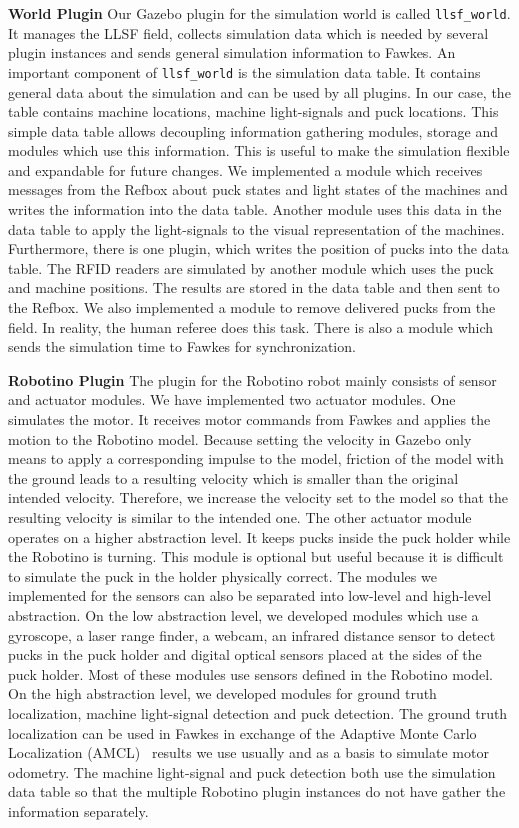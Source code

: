 \textbf{World Plugin}
Our Gazebo plugin for the simulation world is called \texttt{llsf\_world}. It manages the LLSF field, collects simulation data which is needed by several plugin instances and sends general simulation information to Fawkes. An important component of \texttt{llsf\_world} is the simulation data table. It contains general data about the simulation and can be used by all plugins. In our case, the table contains machine locations, machine light-signals and puck locations. This simple data table allows decoupling information gathering modules, storage and modules which use this information. This is useful to make the simulation flexible and expandable for future changes. We implemented a module which receives messages from the Refbox about puck states and light states of the machines and writes the information into the data table. Another module uses this data in the data table to apply the light-signals to the visual representation of the machines. Furthermore, there is one plugin, which writes the position of pucks into the data table. The RFID readers are simulated by another module which uses the puck and machine positions. The results are stored in the data table and then sent to the Refbox. We also implemented a module to remove delivered pucks from the field. In reality, the human referee does this task. There is also a module which sends the simulation time to Fawkes for synchronization.

\textbf{Robotino Plugin}
The plugin for the Robotino robot mainly consists of sensor and actuator modules. We have implemented two actuator modules. One simulates the motor. It receives motor commands from Fawkes and applies the motion to the Robotino model. Because setting the velocity in Gazebo only means to apply a corresponding impulse to the model, friction of the model with the ground leads to a resulting velocity which is smaller than the original intended velocity. Therefore, we increase the velocity set to the model so that the resulting velocity is similar to the intended one. The other actuator module operates on a higher abstraction level. It keeps pucks inside the puck holder while the Robotino is turning. This module is optional but useful because it is difficult to simulate the puck in the holder physically correct. The modules we implemented for the sensors can also be separated into low-level and high-level abstraction. On the low abstraction level, we developed modules which use a gyroscope, a laser range finder, a webcam, an infrared distance sensor to detect pucks in the puck holder and digital optical sensors placed at the sides of the puck holder. Most of these modules use sensors defined in the Robotino model. On the high abstraction level, we developed modules for ground truth localization, machine light-signal detection and puck detection. The ground truth localization can be used in Fawkes in exchange of the Adaptive Monte Carlo Localization (AMCL)~\cite{amcl} results we use usually and as a basis to simulate motor odometry. The machine light-signal and puck detection both use the simulation data table so that the multiple Robotino plugin instances do not have gather the information separately.


